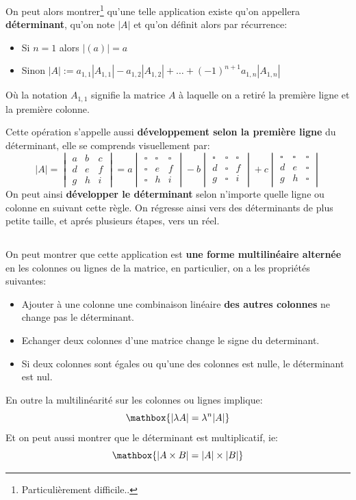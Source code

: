 On peut alors montrer\footnote[1]{Particulièrement difficile..} qu'une telle application existe qu'on appellera \textbf{déterminant}, qu'on note \(|A|\) et qu'on définit alors par récurrence:
\begin{itemize}
   \item Si \(n = 1\) alors \(|(a)| = a \) 
   \item Sinon \(|A| := a_{1, 1}|A_{1, 1}| - a_{1, 2}|A_{1, 2}| + \ldots + (-1)^{n+1}a_{1, n}|A_{1, n}|\)
\end{itemize}
Où la notation \(A_{1, 1}\) signifie la matrice \(A\) à laquelle on a retiré la première ligne et la première colonne. \<

Cette opération s'appelle aussi \textbf{développement selon la première ligne} du déterminant, elle se comprends visuellement par:
\[
   |A| = \begin{vmatrix} a & b & c \\ d & e & f \\ g & h & i \end{vmatrix} = 
   a \begin{vmatrix} \square & \square & \square \\ \square & e & f \\ \square & h & i \end{vmatrix} - 
   b \begin{vmatrix} \square & \square & \square \\ d & \square & f \\ g & \square & i \end{vmatrix} + 
   c \begin{vmatrix} \square & \square & \square \\ d & e & \square \\ g & h & \square \end{vmatrix}   
\]
On peut ainsi \textbf{développer le déterminant} selon n'importe quelle ligne ou colonne en suivant cette règle. On régresse ainsi vers des déterminants de plus petite taille, et aprés plusieurs étapes, vers un réel.

\subsection*{}

On peut montrer que cette application est \textbf{une forme multilinéaire alternée} en les colonnes ou lignes de la matrice, en particulier, on a les propriétés suivantes:
\begin{itemize}
   \item Ajouter à une colonne une combinaison linéaire \textbf{des autres colonnes} ne change pas le déterminant.
   \item Echanger deux colonnes d'une matrice change le signe du determinant.
   \item Si deux colonnes sont égales ou qu'une des colonnes est nulle, le déterminant est nul.
\end{itemize}
En outre la multilinéarité sur les colonnes ou lignes implique:
\[
   \mathbox{|\lambda A| = \lambda^n |A|}   
\]
Et on peut aussi montrer que le déterminant est multiplicatif, ie:
\[
   \mathbox{|A \times B| = |A|\times|B|}   
\]

